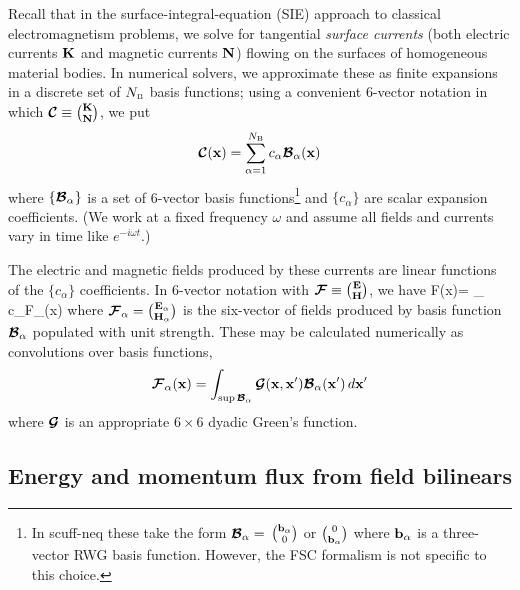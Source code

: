 \documentclass[letterpaper]{article}
\begin{document}
Recall that in the surface-integral-equation (SIE) approach to
classical electromagnetism problems, we solve for tangential
\textit{surface currents} (both electric currents $\mathbf{K}$ 
and magnetic currents $\mathbf{N}$) flowing on the surfaces of 
homogeneous material bodies. In numerical solvers, we 
approximate these as finite expansions in a discrete set
of $N_{\hbox{\tiny{B}}}$ basis functions; using a convenient 6-vector notation 
in which $\boldsymbol{\mathcal{C}}\equiv {\mathbf{K} \choose \mathbf{N}}$, we put
$$ \boldsymbol{\mathcal{C}}(\mathbf{x})=\sum_{\alpha=1}^{N_{\hbox{\tiny{B}}}} 
   c_\alpha \boldsymbol{\mathcal{B}}_\alpha(\mathbf{x}) 
$$ 
where $\{\boldsymbol{\mathcal{B}}_\alpha\}$ is a set of 6-vector basis 
functions\footnote{In {\sc scuff-neq} these take the form
$\boldsymbol{\mathcal{B}}_\alpha=$ 
$\mathbf{b}_\alpha \choose 0$ 
or 
$0 \choose \mathbf{b}_\alpha$
where $\mathbf{b}_\alpha$ is a three-vector RWG basis function.
However, the FSC formalism is not specific to this choice.}
and $\{c_\alpha\}$ are scalar expansion coefficients.
(We work at a fixed frequency $\omega$ and assume all fields
and currents vary in time like $e^{-i\omega t}$.)

The electric and magnetic fields produced by these currents
are linear functions of the $\{c_\alpha\}$ coefficients.
In 6-vector notation with $\boldsymbol{\mathcal{F}}\equiv {\mathbf{E} \choose \mathbf{H}}$, we have
{ \bmc F(\vb x)=
   \sum_{\alpha} c_\alpha \bmc F_\alpha(\vb x)
}
where $\boldsymbol{\mathcal{F}}_\alpha={\mathbf{E}_\alpha \choose \mathbf{H}_\alpha}$ 
is the six-vector of fields produced by basis function $\boldsymbol{\mathcal{B}}_\alpha$ 
populated with unit strength. These may be calculated numerically
as convolutions over basis functions,
$$ \boldsymbol{\mathcal{F}}_\alpha(\mathbf{x})
   =\int_{\sup \boldsymbol{\mathcal{B}}_\alpha} \boldsymbol{\mathcal{G}}(\mathbf{x}, \mathbf{x}^\prime)
    \boldsymbol{\mathcal{B}}_\alpha(\mathbf{x}^\prime) \, d\mathbf{x}^\prime
$$
where $\boldsymbol{\mathcal{G}}$ is an appropriate $6\times 6$ dyadic Green's
function.

\subsection*{Energy and momentum flux from field bilinears}
\end{document}

